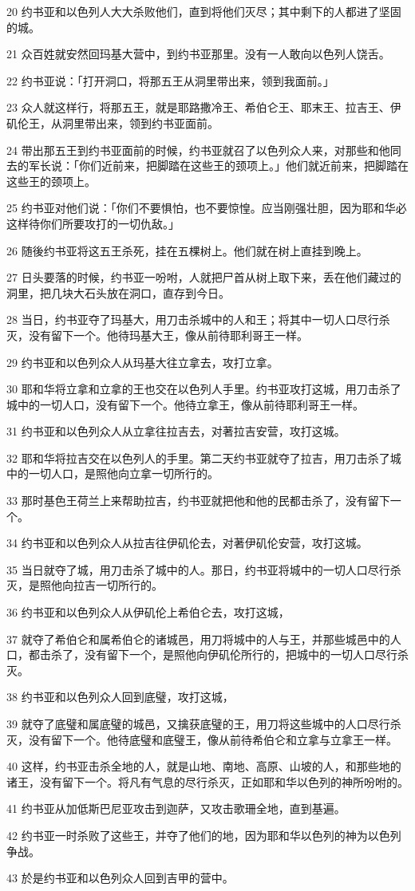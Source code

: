 \par 20 约书亚和以色列人大大杀败他们，直到将他们灭尽；其中剩下的人都进了坚固的城。
\par 21 众百姓就安然回玛基大营中，到约书亚那里。没有一人敢向以色列人饶舌。
\par 22 约书亚说：「打开洞口，将那五王从洞里带出来，领到我面前。」
\par 23 众人就这样行，将那五王，就是耶路撒冷王、希伯仑王、耶末王、拉吉王、伊矶伦王，从洞里带出来，领到约书亚面前。
\par 24 带出那五王到约书亚面前的时候，约书亚就召了以色列众人来，对那些和他同去的军长说：「你们近前来，把脚踏在这些王的颈项上。」他们就近前来，把脚踏在这些王的颈项上。
\par 25 约书亚对他们说：「你们不要惧怕，也不要惊惶。应当刚强壮胆，因为耶和华必这样待你们所要攻打的一切仇敌。」
\par 26 随後约书亚将这五王杀死，挂在五棵树上。他们就在树上直挂到晚上。
\par 27 日头要落的时候，约书亚一吩咐，人就把尸首从树上取下来，丢在他们藏过的洞里，把几块大石头放在洞口，直存到今日。
\par 28 当日，约书亚夺了玛基大，用刀击杀城中的人和王；将其中一切人口尽行杀灭，没有留下一个。他待玛基大王，像从前待耶利哥王一样。
\par 29 约书亚和以色列众人从玛基大往立拿去，攻打立拿。
\par 30 耶和华将立拿和立拿的王也交在以色列人手里。约书亚攻打这城，用刀击杀了城中的一切人口，没有留下一个。他待立拿王，像从前待耶利哥王一样。
\par 31 约书亚和以色列众人从立拿往拉吉去，对著拉吉安营，攻打这城。
\par 32 耶和华将拉吉交在以色列人的手里。第二天约书亚就夺了拉吉，用刀击杀了城中的一切人口，是照他向立拿一切所行的。
\par 33 那时基色王荷兰上来帮助拉吉，约书亚就把他和他的民都击杀了，没有留下一个。
\par 34 约书亚和以色列众人从拉吉往伊矶伦去，对著伊矶伦安营，攻打这城。
\par 35 当日就夺了城，用刀击杀了城中的人。那日，约书亚将城中的一切人口尽行杀灭，是照他向拉吉一切所行的。
\par 36 约书亚和以色列众人从伊矶伦上希伯仑去，攻打这城，
\par 37 就夺了希伯仑和属希伯仑的诸城邑，用刀将城中的人与王，并那些城邑中的人口，都击杀了，没有留下一个，是照他向伊矶伦所行的，把城中的一切人口尽行杀灭。
\par 38 约书亚和以色列众人回到底璧，攻打这城，
\par 39 就夺了底璧和属底璧的城邑，又擒获底璧的王，用刀将这些城中的人口尽行杀灭，没有留下一个。他待底璧和底璧王，像从前待希伯仑和立拿与立拿王一样。
\par 40 这样，约书亚击杀全地的人，就是山地、南地、高原、山坡的人，和那些地的诸王，没有留下一个。将凡有气息的尽行杀灭，正如耶和华以色列的神所吩咐的。
\par 41 约书亚从加低斯巴尼亚攻击到迦萨，又攻击歌珊全地，直到基遍。
\par 42 约书亚一时杀败了这些王，并夺了他们的地，因为耶和华以色列的神为以色列争战。
\par 43 於是约书亚和以色列众人回到吉甲的营中。

